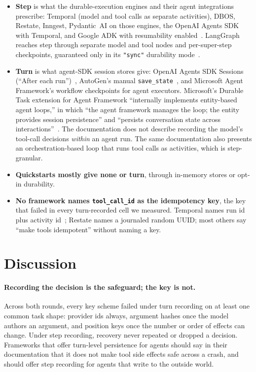 \documentclass[11pt]{article}
\begin{document}
\begin{itemize}
  \item \textbf{Step} is what the durable-execution engines and their agent
        integrations prescribe: Temporal (model and tool calls as separate
        activities), DBOS, Restate, Inngest, Pydantic~AI on those engines,
        the OpenAI Agents SDK with Temporal, and Google ADK with resumability
        enabled~\cite{doc_temporal_agentloop,doc_dbos_ai,doc_restate_agents,doc_adk_resume}. LangGraph reaches step through separate model and tool nodes
        and per-super-step checkpoints, guaranteed only in its
        \texttt{"sync"} durability mode~\cite{doc_langgraph_persistence}.
  \item \textbf{Turn} is what agent-SDK session stores give: OpenAI Agents
        SDK Sessions (``After each run'')~\cite{doc_openai_sessions}, AutoGen's manual
        \texttt{save\_state}~\cite{doc_autogen_state}, and Microsoft Agent Framework's workflow
        checkpoints for agent executors. Microsoft's Durable Task extension for
        Agent Framework ``internally implements entity-based agent loops,''
        in which ``the agent framework manages the loop; the entity provides
        session persistence'' and ``persists conversation state across
        interactions''~\cite{doc_msft_durable_agents,doc_msft_patterns}. The documentation does not describe recording the
        model's tool-call decisions \emph{within} an agent run. The same
        documentation also presents an orchestration-based loop that runs
        tool calls as activities, which is step-granular.
  \item \textbf{Quickstarts mostly give none or turn}, through in-memory
        stores or opt-in durability.
  \item \textbf{No framework names \texttt{tool\_call\_id} as the
        idempotency key}, the key that failed in every turn-recorded cell we
        measured. Temporal names run id plus activity id~\cite{doc_temporal_activity}; Restate names a
        journaled random UUID; most others say ``make tools idempotent''
        without naming a key.
\end{itemize}

\section{Discussion}
\paragraph{Recording the decision is the safeguard; the key is not.}
Across both rounds, every key scheme failed under turn recording on at least
one common task shape: provider ids always, argument hashes once the model
authors an argument, and position keys once the number or order of effects
can change. Under step recording, recovery never repeated or dropped a
decision. Frameworks that offer turn-level persistence for agents should say
in their documentation that it does not make tool side effects safe across a
crash, and should offer step recording for agents that write to the outside
world.
\end{document}
